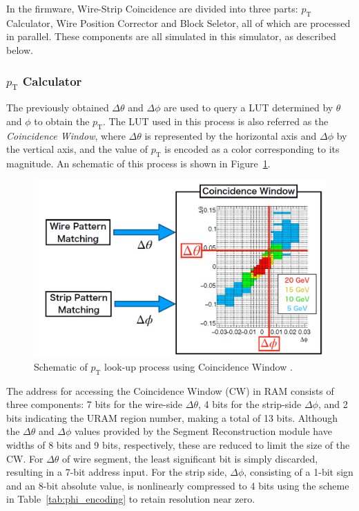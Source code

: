 In the firmware, Wire-Strip Coincidence are divided into three parts: $p_{\mathrm{T}}$ Calculator, Wire Position Corrector and Block Seletor, all of which are processed in parallel. These components are all simulated in this simulator, as described below.

\subsubsection{$p_{\mathrm{T}}$ Calculator}

The previously obtained $\Delta\theta$ and $\Delta\phi$ are used to query a LUT determined by $\theta$ and $\phi$  to obtain the $p_{\mathrm{T}}$. The LUT used in this process is also referred as the \textit{Coincidence Window}, where $\Delta\theta$ is represented by the horizontal axis and $\Delta\phi$ by the vertical axis, and the value of $p_{\mathrm{T}}$ is encoded as a color corresponding to its magnitude. An schematic of this process is shown in Figure~\ref{fig:coin_window}.

\begin{figure}[htbp]
  \centering
  \includegraphics[width=1.0\textwidth]{figs/chapter5/coin_window.png}
  \caption{Schematic of $p_\mathrm{T}$ look-up process using Coincidence Window \cite{EndcapSLPDR}.}
  \label{fig:coin_window}
\end{figure}

The address for accessing the Coincidence Window (CW) in RAM consists of three components: 7 bits for the wire-side \(\Delta\theta\), 4 bits for the strip-side \(\Delta\phi\), and 2 bits indicating the URAM region number, making a total of 13 bits. Although the \(\Delta\theta\) and \(\Delta\phi\) values provided by the Segment Reconstruction module have widths of 8 bits and 9 bits, respectively, these are reduced to limit the size of the CW. For \(\Delta\theta\) of wire segment, the least significant bit is simply discarded, resulting in a 7-bit address input. For the strip side, \(\Delta\phi\), consisting of a 1-bit sign and an 8-bit absolute value, is nonlinearly compressed to 4 bits using the scheme in Table~\ref{tab:phi_encoding} to retain resolution near zero.

